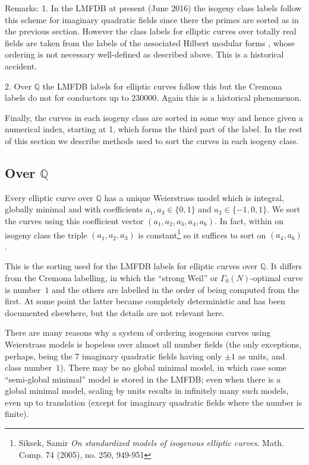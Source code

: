\documentclass{article}
\def\Q{{\mathbb Q}}
\begin{document}
Remarks: 1. In the LMFDB at present (June 2016) the isogeny class
labels follow this scheme for imaginary quadratic fields since there
the primes are sorted as in the previous section.  However the class
labels for elliptic curves over totally real fields are taken from the
labels of the associated Hilbert modular forms , whose ordering is not
necessary well-defined as described above.  This is a historical
accident.

2. Over $\Q$ the LMFDB labels for elliptic curves follow this but the
Cremona labels do not for conductors up to $230000$.  Again this is a
historical phenomenon.

Finally, the curves in each isogeny class are sorted in some way and
hence given a numerical index, starting at 1, which forms the third
part of the label.  In the rest of this section we describe methods
used to sort the curves in each isogeny class.

\subsection{Over \texorpdfstring{$\Q$}{\bf Q}}

Every elliptic curve over $\Q$ has a unique Weierstrass model which is
integral, globally minimal and with coefficients $a_1,a_3\in\{0,1\}$
and $a_3\in\{-1,0,1\}$.  We sort the curves using this coefficient
vector $(a_1,a_2,a_3,a_4,a_6)$.  In fact, within on isogeny class the
triple $(a_1,a_2,a_3)$ is constant\footnote{Siksek, Samir \textit{On
    standardized models of isogenous elliptic curves}. Math. Comp. 74
  (2005), no. 250, 949-951} so it suffices to sort on $(a_4,a_6)$.

This is the sorting used for the LMFDB labels for elliptic curves over
$\Q$.  It differs from the Cremona labelling, in which the ``strong
Weil'' or $\Gamma_0(N)$-optimal curve is number~$1$ and the others are
labelled in the order of being computed from the first.  At some point
the latter became completely deterministic and has been documented
elsewhere, but the details are not relevant here.

There are many reasons why a system of ordering isogenous curves using
Weierstrass models is hopeless over almost all number fields (the only
exceptions, perhaps, being the $7$ imaginary quadratic fields having
only $\pm1$ as units, and class number~$1$).  There may be no global
minimal model, in which case some ``semi-global minimal'' model is
stored in the LMFDB; even when there is a global minimal model,
scaling by units results in infinitely many such models, even up to
translation (except for imaginary quadratic fields where the number is
finite).
\end{document}
